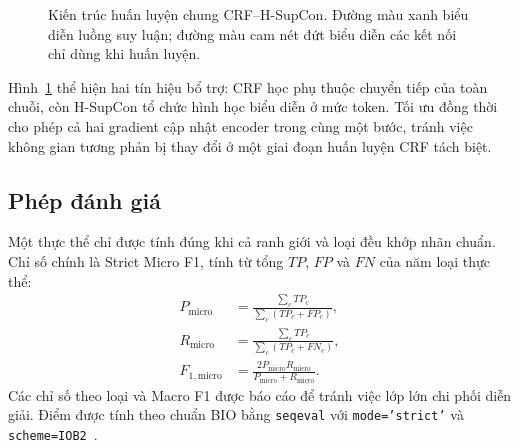 \documentclass[conference,a4paper]{IEEEtran}
\begin{document}
\begin{figure}[t]
\caption{Kiến trúc huấn luyện chung CRF--H-SupCon. Đường màu xanh biểu diễn
luồng suy luận; đường màu cam nét đứt biểu diễn các kết nối chỉ dùng khi huấn luyện.}
\label{fig:architecture}
\end{figure}

Hình~\ref{fig:architecture} thể hiện hai tín hiệu bổ trợ: CRF học phụ
thuộc chuyển tiếp của toàn chuỗi, còn H-SupCon tổ chức hình học biểu
diễn ở mức token. Tối ưu đồng thời cho phép cả hai gradient cập nhật
encoder trong cùng một bước, tránh việc không gian tương phản bị thay
đổi ở một giai đoạn huấn luyện CRF tách biệt.

\subsection{Phép đánh giá}\label{subsec:evaluation}

Một thực thể chỉ được tính đúng khi cả ranh giới và loại đều khớp nhãn
chuẩn. Chỉ số chính là Strict Micro F1, tính từ tổng $TP$, $FP$ và $FN$
của năm loại thực thể:
\begin{align}
P_{\mathrm{micro}}
 &= \frac{\sum_c TP_c}{\sum_c(TP_c+FP_c)},\\
R_{\mathrm{micro}}
 &= \frac{\sum_c TP_c}{\sum_c(TP_c+FN_c)},\\
F_{1,\mathrm{micro}}
 &= \frac{2P_{\mathrm{micro}}R_{\mathrm{micro}}}
 {P_{\mathrm{micro}}+R_{\mathrm{micro}}}.
\end{align}
Các chỉ số theo loại và Macro F1 được báo cáo để tránh việc lớp lớn chi
phối diễn giải. Điểm được tính theo chuẩn BIO bằng
\texttt{seqeval} với \texttt{mode='strict'} và
\texttt{scheme=IOB2}~\cite{nakayama2018seqeval}.
\end{document}
